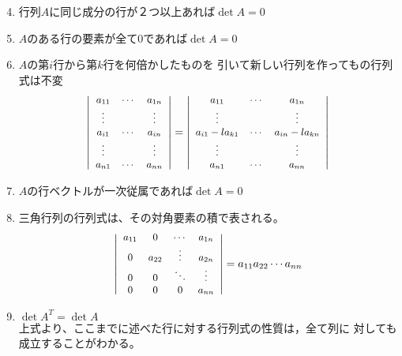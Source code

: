 \documentclass[twocolumn,11pt]{jarticle}
\begin{document}
\begin{enumerate}
  \setcounter{enumi}{3}
\item 行列$A$に同じ成分の行が２つ以上あれば$\det A=0$
\item $A$のある行の要素が全て0であれば$\det A=0$
\item\label{item:|eliminate|} $A$の第$i$行から第$k$行を何倍かしたものを
  引いて新しい行列を作ってもの行列式は不変
  \begin{align}\small
      \left|
        \begin{array}{ccc}
          a_{11}&\cdots&a_{1n}\\
          \vdots&&\vdots\\
          a_{i1}&\cdots&a_{in}\\
          \vdots&&\vdots\\
          a_{n1}&\cdots&a_{nn}
        \end{array}\right|
      =
      \left|
        \begin{array}{ccc}
          a_{11}&\cdots&a_{1n}\\
          \vdots&&\vdots\\
          a_{i1}-la_{k1}&\cdots&a_{in}-la_{kn}\\
          \vdots&&\vdots\\
          a_{n1}&\cdots&a_{nn}
        \end{array}\right|\notag
    \end{align}
\item $A$の行ベクトルが一次従属であれば$\det A=0$
\item\label{item:|triangular|} 三角行列の行列式は、その対角要素の積で表される。
  \begin{align}\small
    \left|
      \begin{array}{cccc}
        a_{11}& 0 & \cdots &a_{1n}\\
        0 & a_{22}& \vdots &a_{2n}\\
        0 & 0 &\ddots& \vdots\\
        0 & 0 & 0 & a_{nn}
      \end{array}\right|
    =a_{11}a_{22}\cdots a_{nn}\notag
  \end{align}
\item $\det A^T=\det A$\\
  \comment 上式より、ここまでに述べた行に対する行列式の性質は，全て列に
  対しても成立することがわかる。
\end{enumerate}
\end{document}
